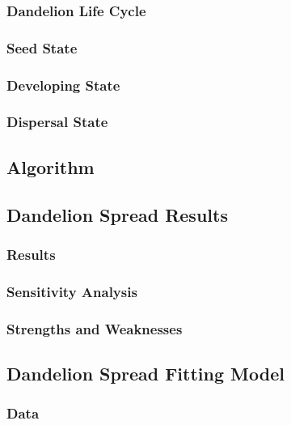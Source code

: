 \documentclass[12pt]{article}
\begin{document}
		\subsubsection{Dandelion Life Cycle}
		
		\subsubsection{Seed State}
		
		\subsubsection{Developing State}
		
		\subsubsection{Dispersal State}
	
	\subsection{Algorithm}
	
	\subsection{Dandelion Spread Results}
	
		\subsubsection{Results}
		
		\subsubsection{Sensitivity Analysis}
		
		\subsubsection{Strengths and Weaknesses}
		
	\subsection{Dandelion Spread Fitting Model}
		
		\subsubsection{Data}
		
\end{document}
